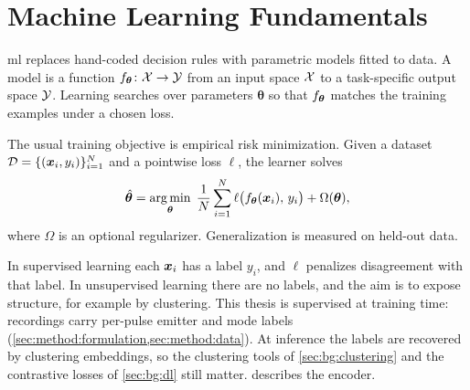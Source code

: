 \section{Machine Learning Fundamentals}\label{sec:bg:ml}

\Gls{ml} replaces hand-coded decision rules with parametric models fitted to data.
A model is a function \(f_{\bm{\theta}}\colon \mathcal{X} \to \mathcal{Y}\) from an input space \(\mathcal{X}\) to a task-specific output space \(\mathcal{Y}\).
Learning searches over parameters \(\bm{\theta}\) so that \(f_{\bm{\theta}}\) matches the training examples under a chosen loss.

The usual training objective is empirical risk minimization.
Given a dataset \(\mathcal{D} = \{(\bm{x}_i, y_i)\}_{i=1}^{N}\) and a pointwise loss \(\ell\), the learner solves
\begin{equation}\label{eq:bg:erm}
  \hat{\bm{\theta}}
  =
  \operatorname*{arg\,min}_{\bm{\theta}}\;
  \frac{1}{N}\sum_{i=1}^{N} \ell\bigl(f_{\bm{\theta}}(\bm{x}_i),\, y_i\bigr) + \Omega(\bm{\theta}),
\end{equation}
where \(\Omega\) is an optional regularizer.
Generalization is measured on held-out data.

In supervised learning each \(\bm{x}_i\) has a label \(y_i\), and \(\ell\) penalizes disagreement with that label.
In unsupervised learning there are no labels, and the aim is to expose structure, for example by clustering.
This thesis is supervised at training time: recordings carry per-pulse emitter and mode labels (\cref{sec:method:formulation,sec:method:data}).
At inference the labels are recovered by clustering embeddings, so the clustering tools of \cref{sec:bg:clustering} and the contrastive losses of \cref{sec:bg:dl} still matter.
 describes the encoder.
